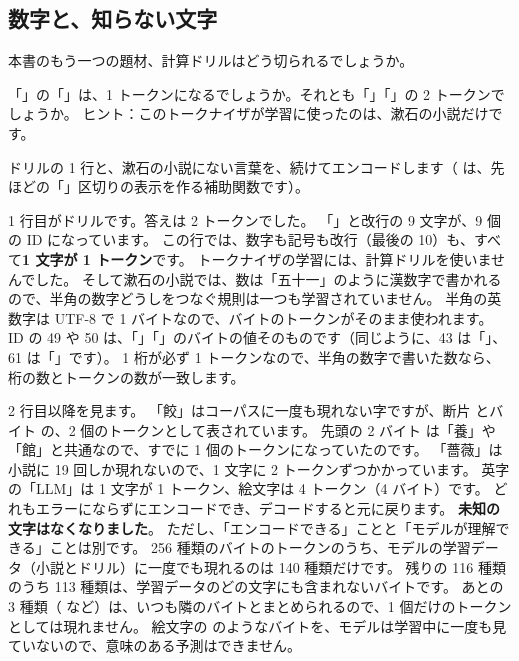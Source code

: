 \subsection*{数字と、知らない文字}

本書のもう一つの題材、計算ドリルはどう切られるでしょうか。

\begin{quiz}
「」の「」は、1 トークンになるでしょうか。それとも「」「」の 2 トークンでしょうか。
ヒント：このトークナイザが学習に使ったのは、漱石の小説だけです。
\end{quiz}

ドリルの 1 行と、漱石の小説にない言葉を、続けてエンコードします（ は、先ほどの「\code{/}」区切りの表示を作る補助関数です）。


1 行目がドリルです。答えは 2 トークンでした。
「」と改行の 9 文字が、9 個の ID になっています。
この行では、数字も記号も改行（最後の 10）も、すべて\textbf{1 文字が 1 トークン}です。
トークナイザの学習には、計算ドリルを使いませんでした。
そして漱石の小説では、数は「五十一」のように漢数字で書かれるので、半角の数字どうしをつなぐ規則は一つも学習されていません。
半角の英数字は UTF-8 で 1 バイトなので、バイトのトークンがそのまま使われます。
ID の 49 や 50 は、「」「」のバイトの値そのものです（同じように、43 は「\code{+}」、61 は「\code{=}」です）。
1 桁が必ず 1 トークンなので、半角の数字で書いた数なら、桁の数とトークンの数が一致します。

2 行目以降を見ます。
「餃」はコーパスに一度も現れない字ですが、断片  とバイト  の、2 個のトークンとして表されています。
先頭の 2 バイト  は「養」や「館」と共通なので、すでに 1 個のトークンになっていたのです。
「薔薇」は小説に 19 回しか現れないので、1 文字に 2 トークンずつかかっています。
英字の「LLM」は 1 文字が 1 トークン、絵文字は 4 トークン（4 バイト）です。
どれもエラーにならずにエンコードでき、デコードすると元に戻ります。
\textbf{未知の文字はなくなりました}。
ただし、「エンコードできる」ことと「モデルが理解できる」ことは別です。
256 種類のバイトのトークンのうち、モデルの学習データ（小説とドリル）に一度でも現れるのは 140 種類だけです。
残りの 116 種類のうち 113 種類は、学習データのどの文字にも含まれないバイトです。
あとの 3 種類（ など）は、いつも隣のバイトとまとめられるので、1 個だけのトークンとしては現れません。
絵文字の  のようなバイトを、モデルは学習中に一度も見ていないので、意味のある予測はできません。

